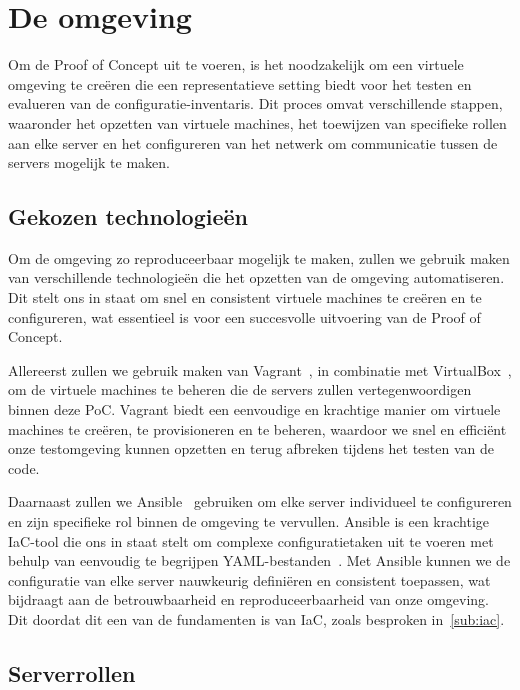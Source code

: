\section{De omgeving}
\label{poc_omgeving}

Om de Proof of Concept uit te voeren, is het noodzakelijk om een virtuele omgeving te cre\"eren die een representatieve setting biedt voor het testen en evalueren van de configuratie-inventaris.
Dit proces omvat verschillende stappen, waaronder het opzetten van virtuele machines, het toewijzen van specifieke rollen aan elke server en het configureren van het netwerk om communicatie tussen de servers mogelijk te maken.

\subsection{Gekozen technologie{\"e}n}
\label{poc_gekozen_technologieen}

Om de omgeving zo reproduceerbaar mogelijk te maken, zullen we gebruik maken van verschillende technologie\"en die het opzetten van de omgeving automatiseren.
Dit stelt ons in staat om snel en consistent virtuele machines te cre\"eren en te configureren, wat essentieel is voor een succesvolle uitvoering van de Proof of Concept.

Allereerst zullen we gebruik maken van Vagrant~\autocite{vagrant-home}, in combinatie met VirtualBox~\autocite{virtualbox-home}, om de virtuele machines te beheren die de servers zullen vertegenwoordigen binnen deze PoC.
Vagrant biedt een eenvoudige en krachtige manier om virtuele machines te cre\"eren, te provisioneren en te beheren, waardoor we snel en effici\"ent onze testomgeving kunnen opzetten en terug afbreken tijdens het testen van de code.

Daarnaast zullen we Ansible~\autocite{ansible-home} gebruiken om elke server individueel te configureren en zijn specifieke rol binnen de omgeving te vervullen.
Ansible is een krachtige IaC-tool die ons in staat stelt om complexe configuratietaken uit te voeren met behulp van eenvoudig te begrijpen YAML-bestanden~\autocite{ansible-docs-yaml}.
Met Ansible kunnen we de configuratie van elke server nauwkeurig defini\"eren en consistent toepassen, wat bijdraagt aan de betrouwbaarheid en reproduceerbaarheid van onze omgeving.
Dit doordat dit een van de fundamenten is van IaC, zoals besproken in~\ref{sub:iac}.

\subsection{Serverrollen}
\label{poc_serverrollen}

